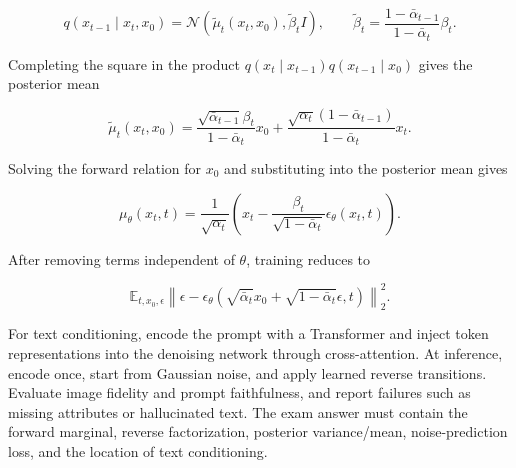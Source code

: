 \documentclass[11pt,a4paper]{article}
\begin{document}
\[
q(x_{t-1}\mid x_t,x_0)=\mathcal{N}(\widetilde\mu_t(x_t,x_0),\widetilde\beta_t I),
\qquad
\widetilde\beta_t=\frac{1-\bar\alpha_{t-1}}{1-\bar\alpha_t}\beta_t.
\]

Completing the square in the product $q(x_t\mid x_{t-1})q(x_{t-1}\mid x_0)$ gives the posterior mean

\[
\widetilde\mu_t(x_t,x_0)
=\frac{\sqrt{\bar\alpha_{t-1}}\beta_t}{1-\bar\alpha_t}x_0
+\frac{\sqrt{\alpha_t}(1-\bar\alpha_{t-1})}{1-\bar\alpha_t}x_t.
\]

Solving the forward relation for $x_0$ and substituting into the posterior mean gives

\[
\mu_\theta(x_t,t)=\frac{1}{\sqrt{\alpha_t}}
\left(x_t-\frac{\beta_t}{\sqrt{1-\bar\alpha_t}}\epsilon_\theta(x_t,t)\right).
\]

After removing terms independent of $\theta$, training reduces to

\[
\mathbb{E}_{t,x_0,\epsilon}
\left\|\epsilon-\epsilon_\theta\left(\sqrt{\bar\alpha_t}x_0+\sqrt{1-\bar\alpha_t}\epsilon,t\right)\right\|_2^2.
\]

For text conditioning, encode the prompt with a Transformer and inject token representations into the denoising network through cross-attention. At inference, encode once, start from Gaussian noise, and apply learned reverse transitions. Evaluate image fidelity and prompt faithfulness, and report failures such as missing attributes or hallucinated text. The exam answer must contain the forward marginal, reverse factorization, posterior variance/mean, noise-prediction loss, and the location of text conditioning.
\end{document}
